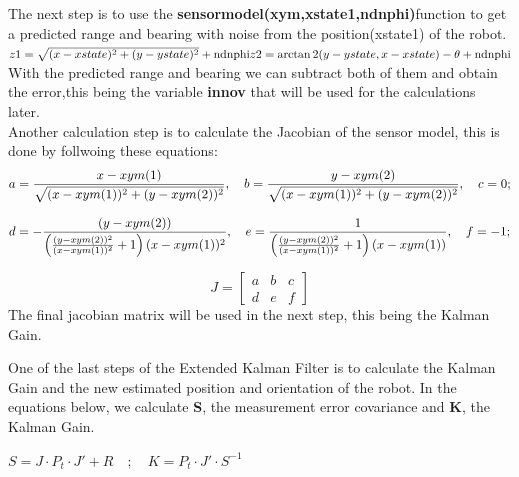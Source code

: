 \documentclass[runningheads]{llncs}
\begin{document}
The next step is to use the \textbf{sensormodel(xym,xstate1,ndnphi)}function to get a predicted range and bearing with noise from the position(xstate1) of the robot. 
\\\begin{math}
    z1=\sqrt{(x-xstate)^2+(y-ystate)^2}+\text{ndnphi} \\
    z2=\arctan2(y-ystate,x-xstate)-\theta+\text{ndnphi}
\end{math}
\\
With the predicted range and bearing we can subtract both of them and obtain the error,this being the variable \textbf{innov} that will be used for the calculations later.
\\

Another calculation step is to calculate the Jacobian of the sensor model, this is done by follwoing these equations:
\
\begin{equation}
a = \frac{x - xym(1)}{\sqrt{(x - xym(1))^2 + (y - xym(2))^2}}, \quad
b = \frac{y - xym(2)}{\sqrt{(x - xym(1))^2 + (y - xym(2))^2}}, \\ \quad 
c = 0;
\end{equation}

\begin{equation}
d = -\frac{(y - xym(2))}{\left(\frac{(y - xym(2))^2}{(x - xym(1))^2} + 1\right)(x - xym(1))^2}, \quad
e = \frac{1}{\left(\frac{(y - xym(2))^2}{(x - xym(1))^2} + 1\right)(x - xym(1))}, \\ \quad
f = -1;
\end{equation}

\begin{equation}
J = \begin{bmatrix}
a & b & c \\
d & e & f
\end{bmatrix}
\end{equation}
The final jacobian matrix  will be used in the next step, this being the Kalman Gain.

One of the last steps of the Extended Kalman Filter is to calculate the Kalman Gain and the new estimated position and orientation of the robot.
In the equations below, we calculate \textbf{S}, the measurement error covariance and \textbf{K}, the Kalman Gain.\\

\begin{center}
    
    \begin{math} 
        S=J\cdot P_t \cdot J'+R \quad ; \quad K=P_t \cdot J' \cdot S^{-1}
    \end{math}
\end{center}
    
\end{document}
